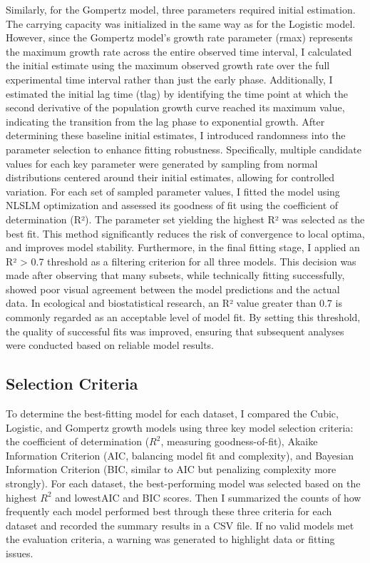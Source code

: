 \documentclass{article}
\begin{document}
Similarly, for the Gompertz model, three parameters required initial estimation. The carrying capacity was initialized in the same way as for the Logistic model. However, since the Gompertz model’s growth rate parameter (rmax) represents the maximum growth rate across the entire observed time interval, I calculated the initial estimate using the maximum observed growth rate over the full experimental time interval rather than just the early phase. Additionally, I estimated the initial lag time (tlag) by identifying the time point at which the second derivative of the population growth curve reached its maximum value, indicating the transition from the lag phase to exponential growth.
After determining these baseline initial estimates, I introduced randomness into the parameter selection to enhance fitting robustness. Specifically, multiple candidate values for each key parameter were generated by sampling from normal distributions centered around their initial estimates, allowing for controlled variation. For each set of sampled parameter values, I fitted the model using NLSLM optimization and assessed its goodness of fit using the coefficient of determination (R²). The parameter set yielding the highest R² was selected as the best fit. This method significantly reduces the risk of convergence to local optima, and improves model stability.
Furthermore, in the final fitting stage, I applied an R² > 0.7 threshold as a filtering criterion for all three models. This decision was made after observing that many subsets, while technically fitting successfully, showed poor visual agreement between the model predictions and the actual data. In ecological and biostatistical research, an R² value greater than 0.7 is commonly regarded as an acceptable level of model fit.\cite{quinn2002experimental} By setting this threshold, the quality of successful fits was improved, ensuring that subsequent analyses were conducted based on reliable model results.

\subsection{Selection Criteria}
To determine the best-fitting model for each dataset, I compared the Cubic, Logistic, and Gompertz growth models using three key model selection criteria: the coefficient of determination (\( R^2 \), measuring goodness-of-fit), Akaike Information Criterion (AIC, balancing model fit and complexity), and Bayesian Information Criterion (BIC, similar to AIC but penalizing complexity more strongly).
 For each dataset, the best-performing model was selected based on the highest \( R^2 \) and lowestAIC and BIC scores. Then I summarized the counts of how frequently each model performed best through these three criteria for each dataset and recorded the summary results in a CSV file. If no valid models met the evaluation criteria, a warning was generated to highlight data or fitting issues.
\end{document}

